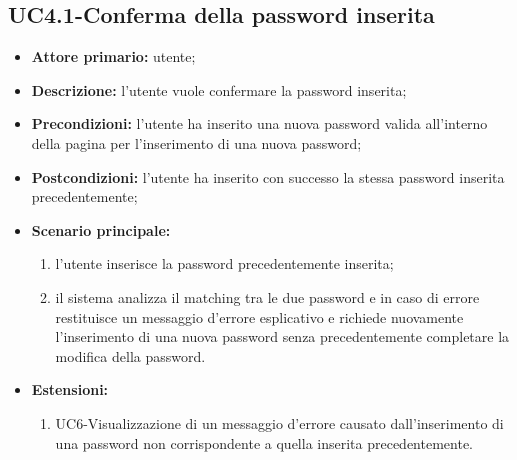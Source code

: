 \subsection{UC4.1-Conferma della password inserita}
\begin{itemize}
	\item \textbf{Attore primario:} utente;

	\item \textbf{Descrizione:} l'utente vuole confermare la password inserita;

	\item \textbf{Precondizioni:} l'utente ha inserito una nuova password valida all'interno della pagina per l'inserimento di una nuova password;

	\item \textbf{Postcondizioni:} l'utente ha inserito con successo la stessa password inserita precedentemente;

	\item \textbf{Scenario principale:}
	\begin{enumerate}
    	\item l'utente inserisce la password precedentemente inserita;
   	    \item il sistema analizza il matching tra le due password e in caso di errore restituisce un messaggio d'errore esplicativo e richiede nuovamente l'inserimento di una nuova password senza precedentemente completare la modifica della password.
\end{enumerate}
	\item \textbf{Estensioni:}
	\begin{enumerate}
    	\item UC6-Visualizzazione di un messaggio d'errore causato dall'inserimento di una password non corrispondente a quella inserita precedentemente. 
	\end{enumerate}
\end{itemize}
